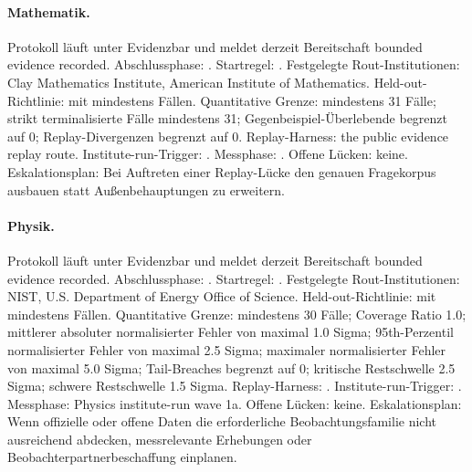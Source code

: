 \paragraph{Mathematik.}
Protokoll  läuft unter Evidenzbar  und meldet derzeit Bereitschaft bounded evidence recorded.
Abschlussphase: . Startregel: .
Festgelegte Rout-Institutionen: Clay Mathematics Institute, \allowbreak American Institute of Mathematics.
Held-out-Richtlinie:  mit mindestens  Fällen.
Quantitative Grenze: mindestens 31 Fälle; strikt terminalisierte Fälle mindestens 31; Gegenbeispiel-Überlebende begrenzt auf 0; Replay-Divergenzen begrenzt auf 0.
Replay-Harness: the public evidence replay route.
Institute-run-Trigger: . Messphase: .
Offene Lücken: keine.
Eskalationsplan: Bei Auftreten einer Replay-Lücke den genauen Fragekorpus ausbauen statt Außenbehauptungen zu erweitern.

\paragraph{Physik.}
Protokoll  läuft unter Evidenzbar  und meldet derzeit Bereitschaft bounded evidence recorded.
Abschlussphase: . Startregel: .
Festgelegte Rout-Institutionen: NIST, \allowbreak U.S. Department of Energy Office of Science.
Held-out-Richtlinie:  mit mindestens  Fällen.
Quantitative Grenze: mindestens 30 Fälle; Coverage Ratio 1.0; mittlerer absoluter normalisierter Fehler von maximal 1.0 Sigma; 95th-Perzentil normalisierter Fehler von maximal 2.5 Sigma; maximaler normalisierter Fehler von maximal 5.0 Sigma; Tail-Breaches begrenzt auf 0; kritische Restschwelle 2.5 Sigma; schwere Restschwelle 1.5 Sigma.
Replay-Harness: .
Institute-run-Trigger: . Messphase: Physics institute-run wave 1a.
Offene Lücken: keine.
Eskalationsplan: Wenn offizielle oder offene Daten die erforderliche Beobachtungsfamilie nicht ausreichend abdecken, messrelevante Erhebungen oder Beobachterpartnerbeschaffung einplanen.


